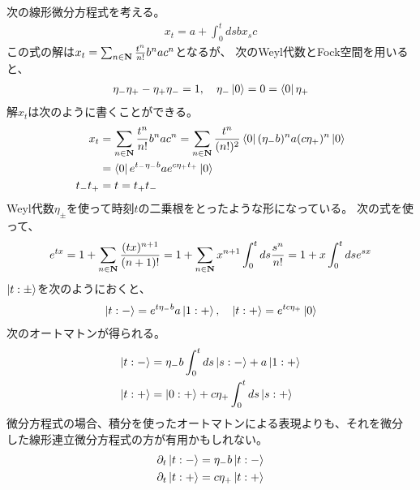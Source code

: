 {	\begin{note}[構造その二]\label{note:構造その二} %
		次の線形微分方程式を考える。
		\begin{equation*}\begin{split}
			x_t = a + \int_0^tds bx_sc
		\end{split}\end{equation*}
		この式の解は$x_t=\sum_{n\in\mathbf{N}}\frac{t^n}{n!}b^nac^n$となるが、
		次のWeyl代数とFock空間を用いると、
		\begin{equation*}\begin{split}
			\eta_-\eta_+ - \eta_+\eta_- = 1,\quad
			\eta_-\mathinner{|{0}\rangle} = 0 = \mathinner{\langle{0}|}\eta_+
		\end{split}\end{equation*}
		解$x_t$は次のように書くことができる。
		\begin{equation*}\begin{split}
			x_t &= \sum_{n\in\mathbf{N}}\frac{t^n}{n!}b^nac^n
			= \sum_{n\in\mathbf{N}}
				\frac{t^n}{(n!)^2}\mathinner{\langle{0}|}(\eta_-b)^na(c\eta_+)^n\mathinner{|{0}\rangle} \\
			&= \mathinner{\langle{0}|}e^{t_-\eta_-b}ae^{c\eta_+t_+}\mathinner{|{0}\rangle} \\
			t_-t_+ &= t = t_+t_- \\
		\end{split}\end{equation*}
		Weyl代数$\eta_\pm$を使って時刻$t$の二乗根をとったような形になっている。
		次の式を使って、
		\begin{equation*}\begin{split}
			e^{tx} = 1 + \sum_{n\in\mathbf{N}}\frac{(tx)^{n+1}}{(n+1)!}
			= 1 + \sum_{n\in\mathbf{N}} x^{n+1} \int_0^tds \frac{s^n}{n!}
			= 1 + x\int_0^t ds e^{sx}
		\end{split}\end{equation*}
		$\mathinner{|{t:\pm}\rangle}$を次のようにおくと、
		\begin{equation*}\begin{split}
			\mathinner{|{t:-}\rangle} = e^{t\eta_-b}a\mathinner{|{1:+}\rangle},\quad
			\mathinner{|{t:+}\rangle} = e^{tc\eta_+}\mathinner{|{0}\rangle}
		\end{split}\end{equation*}
		次のオートマトンが得られる。
		\begin{equation*}\begin{split}
			\mathinner{|{t:-}\rangle} &= \eta_-b\int_0^t ds\mathinner{|{s:-}\rangle} + a\mathinner{|{1:+}\rangle} \\
			\mathinner{|{t:+}\rangle} &= \mathinner{|{0:+}\rangle} + c\eta_+\int_0^t ds\mathinner{|{s:+}\rangle} \\
		\end{split}\end{equation*}
		微分方程式の場合、積分を使ったオートマトンによる表現よりも、それを微分
		した線形連立微分方程式の方が有用かもしれない。
		\begin{equation*}\begin{split}
			\partial_t\mathinner{|{t:-}\rangle} &= \eta_-b\mathinner{|{t:-}\rangle} \\
			\partial_t\mathinner{|{t:+}\rangle} &= c\eta_+\mathinner{|{t:+}\rangle} \\
		\end{split}\end{equation*}
	\end{note} %

}
